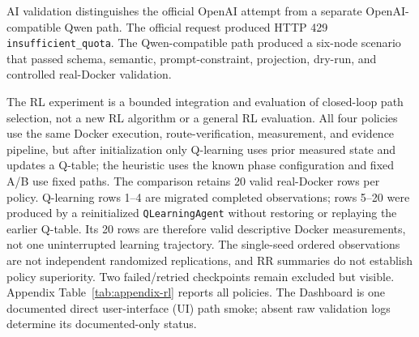 AI validation distinguishes the official OpenAI attempt from a separate OpenAI-compatible Qwen path. The official request produced HTTP 429 \texttt{insufficient\_quota}. The Qwen-compatible path produced a six-node scenario that passed schema, semantic, prompt-constraint, projection, dry-run, and controlled real-Docker validation.

The RL experiment is a bounded integration and evaluation of closed-loop path selection, not a new RL algorithm or a general RL evaluation. All four policies use the same Docker execution, route-verification, measurement, and evidence pipeline, but after initialization only Q-learning uses prior measured state and updates a Q-table; the heuristic uses the known phase configuration and fixed A/B use fixed paths. The comparison retains 20 valid real-Docker rows per policy. Q-learning rows 1--4 are migrated completed observations; rows 5--20 were produced by a reinitialized \texttt{QLearningAgent} without restoring or replaying the earlier Q-table. Its 20 rows are therefore valid descriptive Docker measurements, not one uninterrupted learning trajectory. The single-seed ordered observations are not independent randomized replications, and RR summaries do not establish policy superiority. Two failed/retried checkpoints remain excluded but visible. Appendix Table~\ref{tab:appendix-rl} reports all policies. The Dashboard is one documented direct user-interface (UI) path smoke; absent raw validation logs determine its documented-only status.
